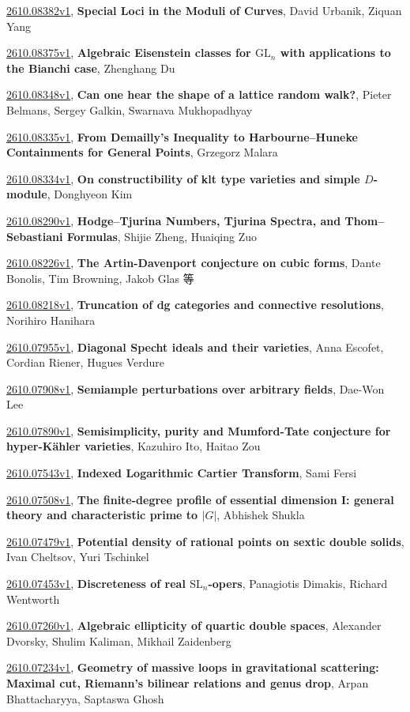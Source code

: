 \documentclass[9pt, a4paper]{article}
\theoremstyle{plain}
\theoremstyle{definition}
\theoremstyle{remark}
\newcommand{\arxiv}[3]{\href{https://arxiv.org/abs/#1}{#1}, \textbf{\textcolor{arxivblue}{#2}}, #3}
\begin{document}
\arxiv{2610.08382v1}{Special Loci in the Moduli of Curves}{David Urbanik, Ziquan Yang}

\arxiv{2610.08375v1}{Algebraic Eisenstein classes for $\mathrm{GL}_n$ with applications to the Bianchi case}{Zhenghang Du}

\arxiv{2610.08348v1}{Can one hear the shape of a lattice random walk?}{Pieter Belmans, Sergey Galkin, Swarnava Mukhopadhyay}

\arxiv{2610.08335v1}{From Demailly's Inequality to Harbourne--Huneke Containments for General Points}{Grzegorz Malara}

\arxiv{2610.08334v1}{On constructibility of klt type varieties and simple $D$-module}{Donghyeon Kim}

\arxiv{2610.08290v1}{Hodge--Tjurina Numbers, Tjurina Spectra, and Thom--Sebastiani Formulas}{Shijie Zheng, Huaiqing Zuo}

\arxiv{2610.08226v1}{The Artin-Davenport conjecture on cubic forms}{Dante Bonolis, Tim Browning, Jakob Glas 等}

\arxiv{2610.08218v1}{Truncation of dg categories and connective resolutions}{Norihiro Hanihara}

\arxiv{2610.07955v1}{Diagonal Specht ideals and their varieties}{Anna Escofet, Cordian Riener, Hugues Verdure}

\arxiv{2610.07908v1}{Semiample perturbations over arbitrary fields}{Dae-Won Lee}

\arxiv{2610.07890v1}{Semisimplicity, purity and Mumford-Tate conjecture for hyper-Kähler varieties}{Kazuhiro Ito, Haitao Zou}

\arxiv{2610.07543v1}{Indexed Logarithmic Cartier Transform}{Sami Fersi}

\arxiv{2610.07508v1}{The finite-degree profile of essential dimension I: general theory and characteristic prime to $|G|$}{Abhishek Shukla}

\arxiv{2610.07479v1}{Potential density of rational points on sextic double solids}{Ivan Cheltsov, Yuri Tschinkel}

\arxiv{2610.07453v1}{Discreteness of real $\mathrm{SL}_n$-opers}{Panagiotis Dimakis, Richard Wentworth}

\arxiv{2610.07260v1}{Algebraic ellipticity of quartic double spaces}{Alexander Dvorsky, Shulim Kaliman, Mikhail Zaidenberg}

\arxiv{2610.07234v1}{Geometry of massive loops in gravitational scattering: Maximal cut, Riemann's bilinear relations and genus drop}{Arpan Bhattacharyya, Saptaswa Ghosh}
\end{document}

